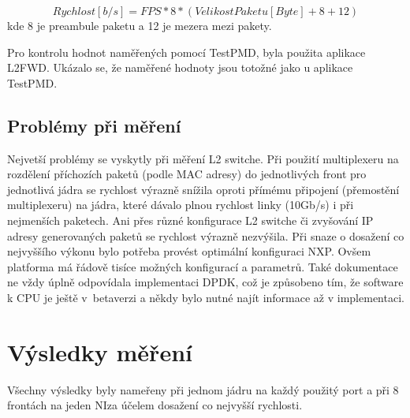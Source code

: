 \documentclass[11pt, titlepage, a4paper]{article}
\begin{document}
		$$ Rychlost [b/s] = FPS * 8 * (VelikostPaketu [Byte] + 8 + 12) $$
		kde 8 je preambule paketu a 12 je mezera mezi pakety.


		Pro kontrolu hodnot naměřených pomocí TestPMD, byla použita aplikace L2FWD.
		Ukázalo se, že naměřené hodnoty jsou totožné jako u aplikace TestPMD.


		\subsection{Problémy při měření}
		Nejvetší problémy se vyskytly při měření L2 switche. Při použití multiplexeru na rozdělení příchozích paketů (podle MAC adresy) do jednotlivých
		front pro jednotlivá jádra se rychlost výrazně snížila oproti přímému připojení (přemostění multiplexeru) na jádra, které dávalo plnou rychlost linky
		(10Gb/s) i při nejmenších paketech.
		Ani přes různé konfigurace L2 switche či zvyšování IP adresy generovaných paketů se rychlost výrazně nezvýšila.
		\newline
		\newline
		Při snaze o dosažení co nejvyššího výkonu bylo potřeba provést optimální konfiguraci NXP.
		Ovšem platforma má řádově tisíce možných konfigurací a parametrů.
		Také dokumentace ne vždy úplně odpovídala implementaci DPDK,
		což je způsobeno tím, že software k CPU je ještě v~betaverzi a někdy bylo nutné najít informace až v implementaci.




		\section{Výsledky měření}

		Všechny výsledky byly nameřeny při jednom jádru na každý použitý port a při 8 frontách na jeden NI\footnotemark[7] za
		účelem dosažení co nejvyšší rychlosti.

\end{document}
